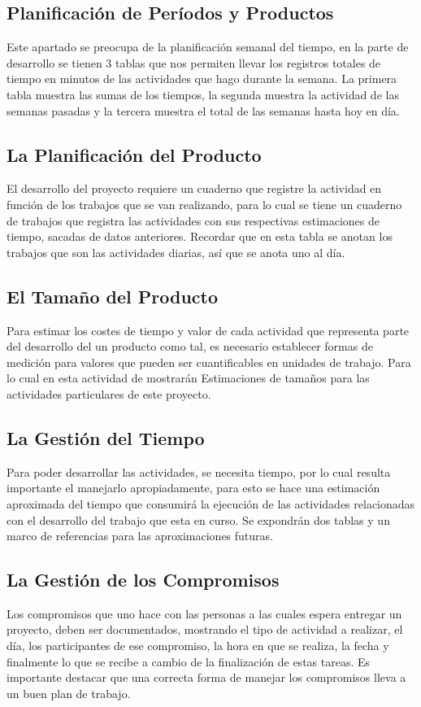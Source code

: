 \documentclass[a4paper,12pt,openany,oneside]{book}
\begin{document}
\subsection{Planificación de Períodos y Productos}
Este apartado se preocupa de la planificación semanal del tiempo, en la parte de desarrollo se tienen 3 tablas que nos permiten llevar los registros totales de tiempo en minutos de las actividades que hago durante la semana. La primera tabla muestra las sumas de los tiempos, la segunda muestra la actividad de las semanas pasadas y la tercera muestra el total de las semanas hasta hoy en día.
\subsection{La Planificación del Producto}
El desarrollo del proyecto requiere un cuaderno que registre la actividad en función de los trabajos que se van realizando, para lo cual se tiene un cuaderno de trabajos que registra las actividades con sus respectivas estimaciones de tiempo, sacadas de datos anteriores. Recordar que en esta tabla se anotan los trabajos que son las actividades diarias, así que se anota uno al día.
\subsection{El Tamaño del Producto}
Para estimar los costes de tiempo y valor de cada actividad que representa parte del desarrollo del un producto como tal, es necesario establecer formas de medición para valores que pueden ser cuantificables en unidades de trabajo. Para lo cual en esta actividad de mostrarán Estimaciones de tamaños para las actividades particulares de este proyecto.
\subsection{La Gestión del Tiempo}
Para poder desarrollar las actividades, se necesita tiempo, por lo cual resulta importante el manejarlo apropiadamente, para esto se hace una estimación aproximada del tiempo que consumirá la ejecución de las actividades relacionadas con el desarrollo del trabajo que esta en curso. Se expondrán dos tablas y un marco de referencias para las aproximaciones futuras.
\subsection{La Gestión de los Compromisos}
Los compromisos que uno hace con las personas a las cuales espera entregar un proyecto, deben ser documentados, mostrando el tipo de actividad a realizar, el día, los participantes de ese compromiso, la hora en que se realiza, la fecha y finalmente lo que se recibe a cambio de la finalización de estas tareas. Es importante destacar que una correcta forma de manejar los compromisos lleva a un buen plan de trabajo.
\end{document}
